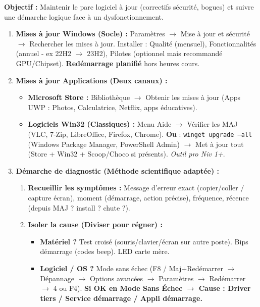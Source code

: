 \documentclass[11pt]{article}
\begin{document}
\begin{methode}
    \textbf{Objectif :} Maintenir le parc logiciel à jour (correctifs sécurité, bogues) et suivre une démarche logique face à un dysfonctionnement.
    \begin{enumerate}
        \item \textbf{Mises à jour Windows (Socle) :} Paramètres $\rightarrow$ Mise à jour et sécurité $\rightarrow$ Rechercher les mises à jour. Installer : Qualité (mensuel), Fonctionnalités (annuel - ex 22H2 $\rightarrow$ 23H2), Pilotes (optionnel mais recommandé GPU/Chipset). \textbf{Redémarrage planifié} hors heures cours.
        \item \textbf{Mises à jour Applications (Deux canaux) :}
              \begin{itemize}
                  \item \textbf{Microsoft Store :} Bibliothèque $\rightarrow$ Obtenir les mises à jour (Apps UWP : Photos, Calculatrice, Netflix, apps éducatives).
                  \item \textbf{Logiciels Win32 (Classiques) :} Menu Aide $\rightarrow$ Vérifier les MAJ (VLC, 7-Zip, LibreOffice, Firefox, Chrome). \textbf{Ou} : \texttt{winget upgrade --all} (Windows Package Manager, PowerShell Admin) $\rightarrow$ Met à jour tout (Store + Win32 + Scoop/Choco si présents). \emph{Outil pro Niv 1+}.
              \end{itemize}
        \item \textbf{Démarche de diagnostic (Méthode scientifique adaptée) :}
              \begin{enumerate}
                  \item \textbf{Recueillir les symptômes :} Message d'erreur exact (copier/coller / capture écran), moment (démarrage, action précise), fréquence, récence (depuis MAJ ? install ? chute ?).
                  \item \textbf{Isoler la cause (Diviser pour régner) :}
                        \begin{itemize}
                            \item \textbf{Matériel ?} Test croisé (souris/clavier/écran sur autre poste). Bips démarrage (codes beep). LED carte mère.
                            \item \textbf{Logiciel / OS ?} Mode sans échec (F8 / Maj+Redémarrer $\rightarrow$ Dépannage $\rightarrow$ Options avancées $\rightarrow$ Paramètres $\rightarrow$ Redémarrer $\rightarrow$ 4 ou F4). \textbf{Si OK en Mode Sans Échec $\rightarrow$ Cause : Driver tiers / Service démarrage / Appli démarrage.}

\end{itemize}
\end{enumerate}
\end{enumerate}
\end{methode}
\end{document}
